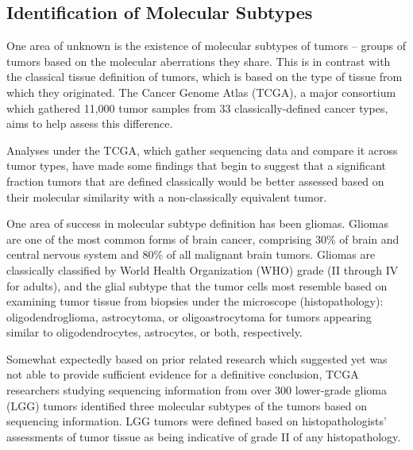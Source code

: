         \subsection{Identification of Molecular Subtypes}

	One area of unknown is the existence of molecular subtypes of
        tumors – groups of tumors based on the molecular aberrations
        they share. This is in contrast with the classical tissue
        definition of tumors, which is based on the type of tissue
        from which they originated. The Cancer Genome Atlas (TCGA)\cite{mclendon_comprehensive_2008}, a
        major consortium which gathered 11,000 tumor samples from 33
        classically-defined cancer types, aims to help assess this
        difference.
        
        Analyses under the TCGA, which gather sequencing data and compare it
        across tumor types, have made some findings that begin to suggest that
        a significant fraction tumors that are defined classically would be
        better assessed based on their molecular similarity with a
        non-classically equivalent tumor.

        One area of success in molecular subtype definition has been
        gliomas. Gliomas are one of the most common forms of brain
        cancer, comprising 30\% of brain and central nervous system
        and 80\% of all malignant brain tumors. Gliomas are
        classically classified by World Health Organization (WHO)
        grade (II through IV for adults), and the glial subtype that
        the tumor cells most resemble based on examining tumor tissue
        from biopsies under the microscope (histopathology):
        oligodendroglioma, astrocytoma, or oligoastrocytoma for tumors
        appearing similar to oligodendrocytes, astrocytes, or both,
        respectively. 
        

        Somewhat expectedly based on prior related research which suggested
        yet was not able to provide sufficient evidence for a definitive
        conclusion, TCGA researchers studying sequencing information from over
        300 lower-grade glioma (LGG) tumors identified three molecular
        subtypes of the tumors based on sequencing information. LGG tumors
        were defined based on histopathologists’ assessments of tumor tissue
        as being indicative of grade II of any histopathology.


